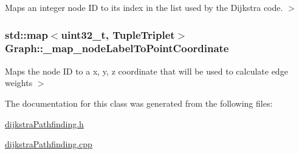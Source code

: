 Maps an integer node I\-D to its index in the list used by the Dijkstra code. $>$ 

\hypertarget{classGraph_ad4cf5d8f988e253e00aaa73a72810233}{
\subsubsection[{\-\_\-map\-\_\-node\-Label\-To\-Point\-Coordinate}]{\setlength{\rightskip}{0pt plus 5cm}std\-::map$<$uint32\-\_\-t, {\bf Tuple\-Triplet}$>$ Graph\-::\-\_\-map\-\_\-node\-Label\-To\-Point\-Coordinate}}\label{classGraph_ad4cf5d8f988e253e00aaa73a72810233}


Maps the node I\-D to a x, y, z coordinate that will be used to calculate edge weights $>$ 



The documentation for this class was generated from the following files\-:\begin{DoxyCompactItemize}
\item 
\hyperlink{dijkstraPathfinding_8h}{dijkstra\-Pathfinding.\-h}\item 
\hyperlink{dijkstraPathfinding_8cpp}{dijkstra\-Pathfinding.\-cpp}\end{DoxyCompactItemize}

